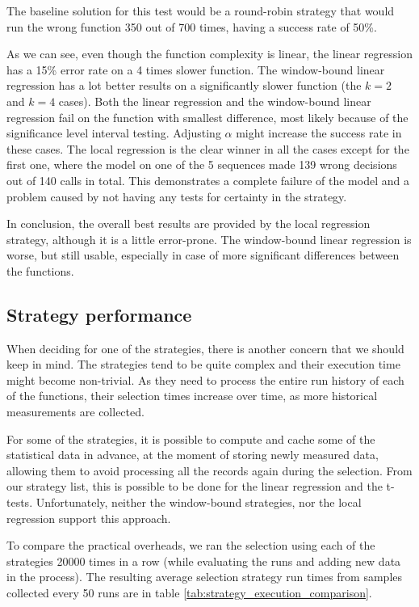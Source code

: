 The baseline solution for this test would be a round-robin strategy that would run the wrong function 350 out of 700 times, having a success rate of 50\%. 

As we can see, even though the function complexity is linear, the linear regression has a 15\% error rate on a 4 times slower function. The window-bound linear regression has a lot better results on a significantly slower function (the $k=2$ and $k=4$ cases). Both the linear regression and the window-bound linear regression fail on the function with smallest difference, most likely because of the significance level interval testing. Adjusting $\alpha$ might increase the success rate in these cases. The local regression is the clear winner in all the cases except for the first one, where the model on one of the 5 sequences made 139 wrong decisions out of 140 calls in total. This demonstrates a complete failure of the model and a problem caused by not having any tests for certainty in the strategy.

In conclusion, the overall best results are provided by the local regression strategy, although it is a little error-prone. The window-bound linear regression is worse, but still usable, especially in case of more significant differences between the functions.

\subsection{Strategy performance}
\label{subsec:strategy_perf}

When deciding for one of the strategies, there is another concern that we should keep in mind. The strategies tend to be quite complex and their execution time might become non-trivial. As they need to process the entire run history of each of the functions, their selection times increase over time, as more historical measurements are collected.

For some of the strategies, it is possible to compute and cache some of the statistical data in advance, at the moment of storing newly measured data, allowing them to avoid processing all the records again during the selection. From our strategy list, this is possible to be done for the linear regression and the t-tests. Unfortunately, neither the window-bound strategies, nor the local regression support this approach.

To compare the practical overheads, we ran the selection using each of the strategies 20000 times in a row (while evaluating the runs and adding new data in the process). The resulting average selection strategy run times from samples collected every 50 runs are in table \ref{tab:strategy_execution_comparison}.

